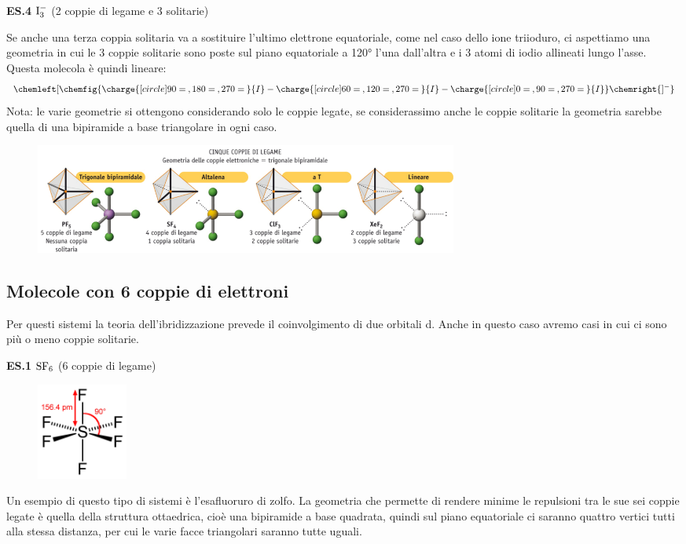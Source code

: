 \vspace{0.2cm}\textbf{ES.4} $\rm I_3^-$ (2 coppie di legame e 3 solitarie)

\vspace{0.2cm}Se anche una terza coppia solitaria va a sostituire l'ultimo elettrone equatoriale, come nel caso dello ione triioduro, ci aspettiamo una geometria in cui le 3 coppie solitarie sono poste sul piano equatoriale a 120° l'una dall'altra e i 3 atomi di iodio allineati lungo l'asse. Questa molecola è quindi lineare:
$$
\chemleft[ \chemfig{\charge{[circle]90=\:,180=\:,270=\:}{I}-\charge{[circle]60=\:,120=\:,270=\:}{I}-\charge{[circle]0=\:,90=\:,270=\:}{I}} \chemright{]^{-}}
$$
Nota: le varie geometrie si ottengono considerando solo le coppie legate, se considerassimo anche le coppie solitarie la geometria sarebbe quella di una bipiramide a base triangolare in ogni caso.
\begin{figure}[htp]
    \centering
    \includegraphics[width=14cm]{immagini/geometrie-5-coppie.png}
\end{figure}
\subsection{Molecole con 6 coppie di elettroni}
Per questi sistemi la teoria dell'ibridizzazione prevede il coinvolgimento di due orbitali d. Anche in questo caso avremo casi in cui ci sono più o meno coppie solitarie.

\vspace{0.2cm}\textbf{ES.1} $\rm SF_6$ (6 coppie di legame)

\hspace{1cm}\begin{minipage}{0.2\textwidth}
    \begin{figure}[H]
    \includegraphics[width=3cm]{immagini/SF_6.png}
    \end{figure}
    \end{minipage} \hfill
    \begin{minipage}{0.65\textwidth}
        \vspace{0.2cm}Un esempio di questo tipo di sistemi è l'esafluoruro di zolfo. La geometria che permette di rendere minime le repulsioni tra le sue sei coppie legate è quella della struttura ottaedrica, cioè una bipiramide a base quadrata, quindi sul piano equatoriale ci saranno quattro vertici tutti alla stessa distanza, per cui le varie facce triangolari saranno tutte uguali.
    \end{minipage}

